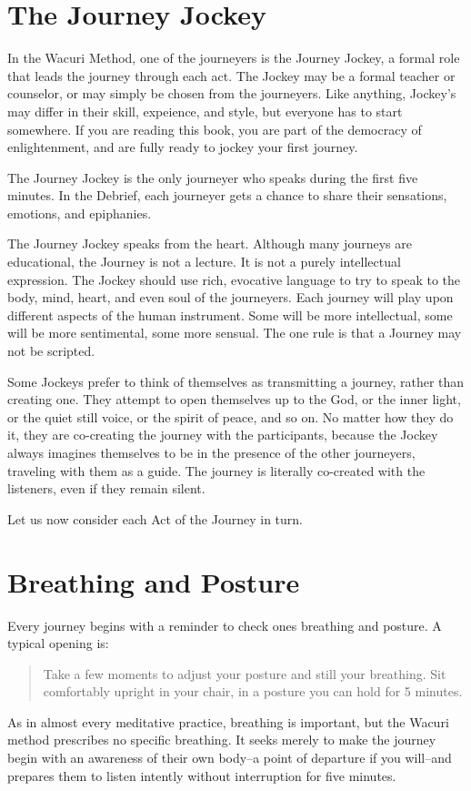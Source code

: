 \documentclass[12pt]{book}
\begin{document}
\section{The Journey Jockey}

In the Wacuri Method, one of the journeyers is the Journey Jockey, a
formal role that leads the journey through each act. The Jockey
may be a formal teacher or counselor, or may simply be chosen
from the journeyers. Like anything, Jockey's may differ in
their skill, expeience, and style, but everyone has to start
somewhere. If you are reading this book, you are part of the
democracy of enlightenment, and are fully ready to jockey
your first journey.

The Journey Jockey is the only journeyer who speaks during the
first five minutes.  In the Debrief, each journeyer gets a
chance to share their sensations, emotions, and epiphanies.

The Journey Jockey speaks from the heart. Although many journeys
are educational, the Journey is not a lecture. It is not a
purely intellectual expression. The Jockey should use
rich, evocative language to try to speak to the body, mind,
heart, and even soul of the journeyers. Each journey will
play upon different aspects of the human instrument. Some
will be more intellectual, some will be more sentimental,
some more sensual. The one rule is that a Journey may not be
scripted.

Some Jockeys prefer to think of themselves as transmitting
a journey, rather than creating one. They attempt to open themselves
up to the God, or the inner light, or the quiet still voice, or
the spirit of peace, and so on. No matter how they do it,
they are co-creating the journey with the participants,
because the Jockey always imagines themselves to be in the
presence of the other journeyers, traveling with them as a guide.
The journey is literally co-created with the listeners, even
if they remain silent.

Let us now consider each Act of the Journey in turn.

\section{ Breathing and Posture}

Every journey begins with a reminder to check ones breathing and
posture. A typical opening is:
\begin{quote}
  Take a few moments to adjust your posture and still your breathing.
  Sit comfortably upright in your chair, in a posture you can
  hold for 5 minutes.
\end{quote}
As in almost every meditative practice, breathing is important, but
the Wacuri method prescribes no specific breathing. It seeks merely
to make the journey begin with an awareness of their own body--a
point of departure if you will--and prepares them to listen
intently without interruption for five minutes.
\end{document}
